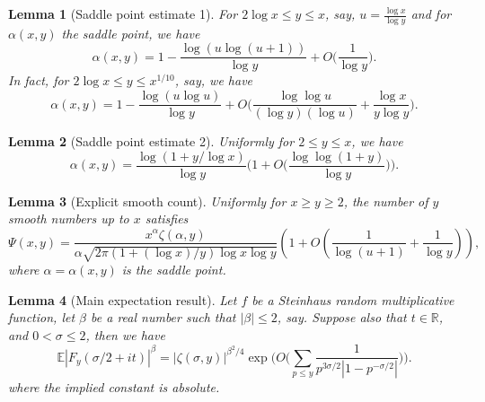 \documentclass[10pt,a4paper]{amsart}
\newtheorem{lemma}{Lemma}
\def\E{\mathbb E}
\def\R{\mathbb R}
\def\leq {\leqslant}
\begin{document}
\begin{lemma}[Saddle point estimate 1]\label{l:saddle point approx}  
For $2 \log x \leq y \leq x$, say, $u= \frac{\log x}{\log y}$ and for $\alpha(x, y)$ the saddle point, we have
\[
\alpha (x,y) = 1 - \frac{\log (u \log (u + 1))}{\log y} + O \biggl( \frac{1}{\log y} \biggr).
\] 
In fact, for $2 \log x \leq y \leq x^{1/10}$, say, we have 
\[
\alpha (x,y) = 1 - \frac{\log (u \log u)}{\log y} + O \biggl( \frac{\log \log u}{(\log y) (\log u)} + \frac{\log x}{y \log y}\biggr).
\] 
\end{lemma}

\begin{lemma}[Saddle point estimate 2]\label{l:saddle point approx uniform}  
Uniformly for $2 \leq y \leq x$, we have
\[
\alpha (x,y) = \frac{\log ( 1 + y/\log x )}{\log y} \biggl( 1 + O \biggl( \frac{\log \log (1+y)}{\log y} \biggr) \biggr).
\] 
\end{lemma}

\begin{lemma}[Explicit smooth count]\label{l:smooth count in terms of saddle point}
Uniformly for $x \geq y \geq 2$, the number of $y$ smooth numbers up to $x$ satisfies
\[
\Psi(x, y)=\frac{x^\alpha \zeta(\alpha, y)}{\alpha \sqrt{2 \pi(1+(\log x) / y) \log x \log y}}\left(1+O\left(\frac{1}{\log (u+1)}+\frac{1}{\log y}\right)\right),
\]
where $\alpha = \alpha (x,y)$ is the saddle point.
\end{lemma}

\begin{lemma}[Main expectation result]\label{l:exp result moderate y}
Let $f$ be a Steinhaus random multiplicative function, let $\beta$ be a real number such that $|\beta| \leq 2$, say. Suppose also that $t \in \R$, and $0 < \sigma \leq 2$, then we have
\[
\E |F_y (\sigma / 2 + it)|^{\beta} = |\zeta (\sigma, y)|^{\beta^2/4} \exp \biggl( O \biggl( \sum_{p \leq y} \frac{1}{p^{3 \sigma / 2} | 1 - p^{-\sigma/2}|} \biggr) \biggr).
\]
where the implied constant is absolute.
\end{lemma}
\end{document}
